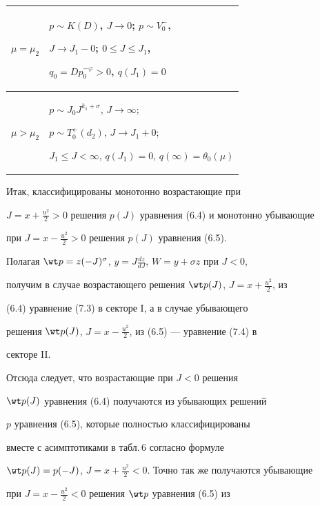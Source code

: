 \begin{center}
\begin{tabular}{|p{2.6cm}|p{6.5cm}|p{6.5cm}|}
$\mu=\mu_2$ & 


\multicolumn{2}{|l|}{%


\parbox{13cm}{$p\sim K(D)$, $J\to0$; $p\sim V^-_0$, 


$J\to J_1-0$; $0\le J\le J_1$, 


$q_0=D p_0^{-\varphi}>0$, $q(J_1)=0$}} \\ 


\hline 


$\mu>\mu_2$ & \multicolumn{2}{|l|}{%


\parbox{13cm}{$p\sim J_0J^{k_1+\sigma}$, $J\to\infty$; 


$p\sim T^+_0(d_2)$, $J\to J_1+0$; 


$J_1\le J<\infty$, $q(J_1)=0$, $q(\infty)=\theta_0(\mu)$}}\\ 


\hline 


\end{tabular} 


\end{center} 


 


Итак, классифицированы монотонно возрастающие при 


$J=x+\frac{u^2}{2}>0$ решения $p(J)$ уравнения (6.4) и монотонно убывающие 


при $J=x-\frac{u^2}{2}>0$ решения $p(J)$ уравнения (6.5). 


Полагая  $\wt p=z(-J)^\sigma$, $y=J\frac{dz}{dJ}$, $W=y+\sigma 


z$ при $J<0$, 


получим в случае возрастающего решения $\wt p(J)$, $J=x+\frac{u^2}{2}$, из 


(6.4) уравнение (7.3) в секторе I, а в случае убывающего  


решения $\wt p(J)$, $J=x-\frac{u^2}{2}$, из (6.5) --- уравнение (7.4) в 


секторе II. 


Отсюда следует, что возрастающие при $J<0$ решения  


$\wt p(J)$ уравнения (6.4) получаются из убывающих решений  


$p$ уравнения (6.5), которые полностью классифицированы  


вместе с асимптотиками в табл.\,6 согласно формуле  


$\wt p(J)=p(-J)$, $J=x+\frac{u^2}{2}<0$. Точно так же получаются убывающие  


при $J=x-\frac{u^2}{2}<0$ решения $\wt p$ уравнения (6.5) из  


